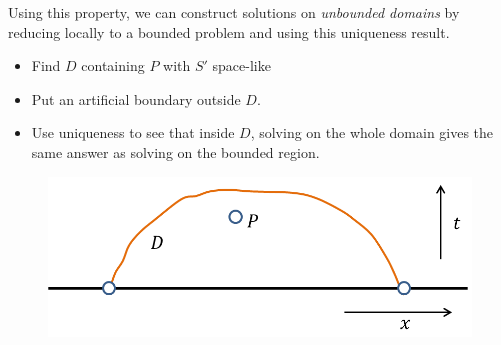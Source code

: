 \documentclass[12pt,a4paper]{report}
\begin{document}
Using this property, we can construct solutions on \emph{unbounded domains} by reducing locally to a bounded problem and using this uniqueness result.
\begin{itemize}
\item Find $D$ containing $P$ with $S'$ space-like 
\item Put an artificial boundary outside $D$.
\item Use uniqueness to see that inside $D$, solving on the whole domain gives the same answer as solving on the bounded region.
\end{itemize}
\begin{figure}[h]
	\begin{center}
		\includegraphics[scale=0.6]{13}
	\end{center}
\end{figure}
\end{document}
